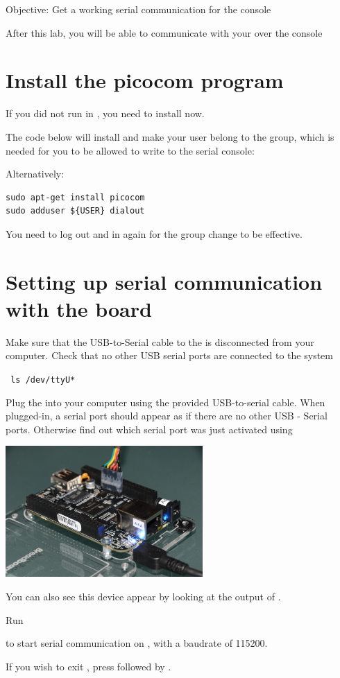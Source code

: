 {Objective: Get a working serial communication for the console}

After this lab, you will be able to communicate with your \devboard over the console

\section{Install the picocom program}

If you did not run  in \labdir, you need to install  now.

The code below will install  and make your user belong to the  
group, which is needed for you to be allowed to write to the serial console:

Alternatively:

\begin{verbatim}
sudo apt-get install picocom
sudo adduser ${USER} dialout
\end{verbatim}

You need to log out and in again for the group change to be effective.

\section{Setting up serial communication with the board}

Make sure that the USB-to-Serial cable to the \devboard is disconnected from your computer. Check that no other USB serial ports are connected to the system

{\small
{\tt
ls /dev/ttyU*
}
}

Plug the \devboard into your computer using the provided
USB-to-serial cable. When plugged-in, a serial port should appear as
 if there are no other USB - Serial ports.
Otherwise find out which serial port was just activated using 

{
  \begin{center}
    \includegraphics[height=5cm]{labs/setup-serial/beaglebone-black-serial.jpg}
  \end{center}
}

You can also see this device appear by looking at the output of
.



Run 

to start serial communication on , with a baudrate of 115200.

If you wish to exit , press \code{[Ctrl][a]} followed by
\code{[Ctrl][x]}.


